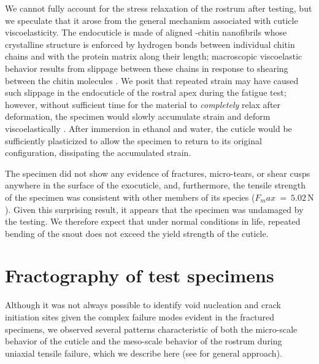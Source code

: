 \documentclass[twocolumn, linenumbers, superscriptaddress, nofootinbib]{revtex4-1}
\begin{document}
		We cannot fully account for the stress relaxation of the rostrum after testing, but we speculate that it arose from the general mechanism associated with cuticle viscoelasticity.
		The endocuticle is made of aligned \textalpha-chitin nanofibrils whose crystalline structure is enforced by hydrogen bonds between individual chitin chains and with the protein matrix along their length; macroscopic viscoelastic behavior results from slippage between these chains in response to shearing between the chitin molecules \cite{Vincent2004, Evans1967, Sun2012}.
		We posit that repeated strain may have caused such slippage in the endocuticle of the rostral apex during the fatigue test; however, without sufficient time for the material to \textit{completely} relax after deformation, the specimen would slowly accumulate strain and deform viscoelastically \cite{Munster2013}.
		After immersion in ethanol and water, the cuticle would be sufficiently plasticized to allow the specimen to return to its original configuration, dissipating the accumulated strain.
		
		The specimen did not show any evidence of fractures, micro-tears, or shear cusps anywhere in the surface of the exocuticle, and, furthermore, the tensile strength of the specimen was consistent with other members of its species ($F_max~=~5.02\,\text{N}$).
		Given this surprising result, it appears that the specimen was undamaged by the testing.
		We therefore expect that under normal conditions in life, repeated bending of the snout does not exceed the yield strength of the cuticle.
			
	\section{Fractography of test specimens}
		Although it was not always possible to identify void nucleation and crack initiation sites given the complex failure modes evident in the fractured specimens, we observed several patterns characteristic of both the micro-scale behavior of the cuticle and the meso-scale behavior of the rostrum during uniaxial tensile failure, which we describe here (see \cite{Greenhalgh2009} for general approach).
		
\end{document}
